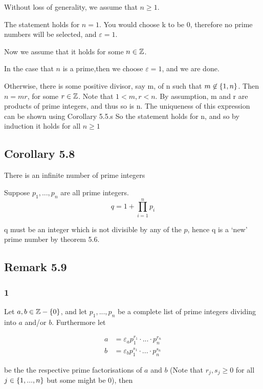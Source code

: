 \documentclass[12pt]{article} %
\begin{document}
Without loss of generality, we assume that $n \geq 1$.

The statement holds for $n = 1$. You would choose k to be 0, therefore no prime numbers will be selected, and $\varepsilon = 1$.

Now we assume that it holds for some $n \in \mathbb{Z}$.

In the case that $n$ is a prime,then we choose $\varepsilon = 1$, and we are done.

Otherwise, there is some positive divisor, say m, of n such that $m \not \in \left\{1, n\right\}$. Then $n = m r$, for some $r \in \mathbb{Z}$. Note that $1 < m, r < n$.
By assumption, m and r are products of prime integers, and thus so is n. The uniqueness of this expression can be shown using Corollary 5.5.s So the statement holds
for n, and so by induction it holds for all $n \geq 1$

\subsection*{Corollary 5.8}
\begin{grayBoxed}
    There is an infinite number of prime integers
\end{grayBoxed}

Suppose $p_1, ..., p_n$ are all prime integers.
$$
    q = 1 + \prod_{i = 1}^{n} p_i
$$

q must be an integer which is not divisible by any of the $p$, hence q is a `new' prime number by theorem 5.6.

\subsection*{Remark 5.9}

\subsubsection*{1}
Let $a, b \in \mathbb{Z} - \left\{0\right\}$, and let $p_1, ..., p_n$ be a complete list of prime integers dividing into $a$ and/or $b$. Furthermore let

\begin{align*}
    a & = \varepsilon_a p_{1}^{r_1} \cdot ... \cdot p_{n}^{r_n} \\
    b & = \varepsilon_b p_{1}^{s_1} \cdot ... \cdot p_{n}^{s_n}
\end{align*}

be the the respective prime factorisations of $a$ and $b$ (Note that $r_j, s_j \geq 0$ for all $j \in \left\{1, ..., n\right\}$ but some might be 0), then
\end{document}
